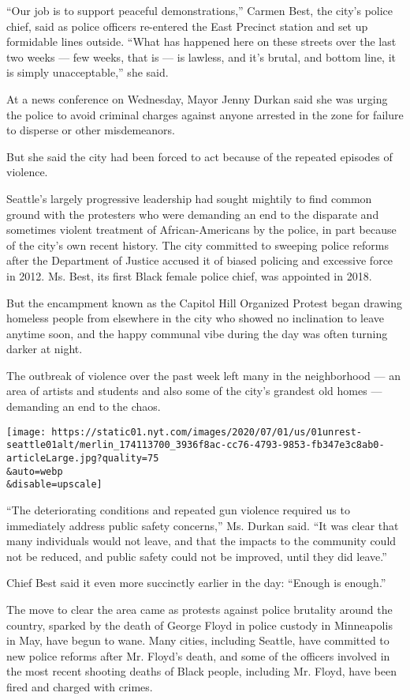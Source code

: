 ``Our job is to support peaceful demonstrations,'' Carmen Best, the
city's police chief, said as police officers re-entered the East
Precinct station and set up formidable lines outside. ``What has
happened here on these streets over the last two weeks --- few weeks,
that is --- is lawless, and it's brutal, and bottom line, it is simply
unacceptable,'' she said.

At a news conference on Wednesday, Mayor Jenny Durkan said she was
urging the police to avoid criminal charges against anyone arrested in
the zone for failure to disperse or other misdemeanors.

But she said the city had been forced to act because of the repeated
episodes of violence.

Seattle's largely progressive leadership had sought mightily to find
common ground with the protesters who were demanding an end to the
disparate and sometimes violent treatment of African-Americans by the
police, in part because of the city's own recent history. The city
committed to sweeping police reforms after the Department of Justice
accused it of biased policing and excessive force in 2012. Ms. Best, its
first Black female police chief, was appointed in 2018.

But the encampment known as the Capitol Hill Organized Protest began
drawing homeless people from elsewhere in the city who showed no
inclination to leave anytime soon, and the happy communal vibe during
the day was often turning darker at night.

The outbreak of violence over the past week left many in the
neighborhood --- an area of artists and students and also some of the
city's grandest old homes --- demanding an end to the chaos.

\texttt{[image: https://static01.nyt.com/images/2020/07/01/us/01unrest-seattle01alt/merlin\_174113700\_3936f8ac-cc76-4793-9853-fb347e3c8ab0-articleLarge.jpg?quality=75\\\&auto=webp\\\&disable=upscale]}

``The deteriorating conditions and repeated gun violence required us to
immediately address public safety concerns,'' Ms. Durkan said. ``It was
clear that many individuals would not leave, and that the impacts to the
community could not be reduced, and public safety could not be improved,
until they did leave.''

Chief Best said it even more succinctly earlier in the day: ``Enough is
enough.''

The move to clear the area came as protests against police brutality
around the country, sparked by the death of George Floyd in police
custody in Minneapolis in May, have begun to wane. Many cities,
including Seattle, have committed to new police reforms after Mr.
Floyd's death, and some of the officers involved in the most recent
shooting deaths of Black people, including Mr. Floyd, have been fired
and charged with crimes.

